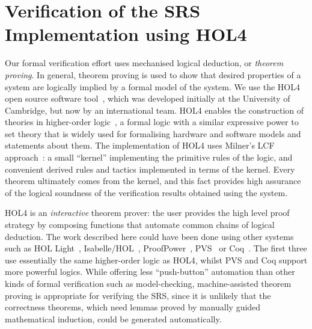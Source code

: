 \documentclass{llncs}
\begin{document}
\section{Verification of the SRS Implementation using HOL4}
\label{sec-verification}


Our formal verification effort uses mechanised logical deduction, or \emph{theorem proving}.
In general, theorem proving is used to show that desired properties of a system are logically implied by a formal model of the system.
We use the HOL4 open source software tool~\cite{HOL4,DBLP:conf/tphol/SlindN08}, which was developed initially at the University of Cambridge, but now by an international team.
HOL4 enables the construction of theories in higher-order logic~\cite{DBLP:journals/jsyml/Church40}, a formal logic with a similar expressive power to set theory that is widely used for formalising hardware and software models and statements about them.
The implementation of HOL4 uses Milner's LCF approach~\cite{Milner:1972:LCF:891954}: a small ``kernel'' implementing the primitive rules of the logic, and convenient derived rules and tactics implemented in terms of the kernel.
Every theorem ultimately comes from the kernel, and this fact provides high assurance of the logical soundness of the verification results obtained using the system.

HOL4 is an \emph{interactive} theorem prover: the user provides the high level proof strategy by composing functions that automate common chains of logical deduction.
The work described here could have been done using other systems such as HOL Light~\cite{HOLLight,DBLP:conf/tphol/Harrison09a}, Isabelle/HOL~\cite{Isabelle}, ProofPower~\cite{ProofPower}, PVS~\cite{PVS,DBLP:conf/tphol/OwreS08} or Coq~\cite{Coq}.
The first three use essentially the same higher-order logic as HOL4, whilst PVS and Coq support more powerful logics.
While offering less ``push-button'' automation than other kinds of formal verification such as model-checking, machine-assisted theorem proving is appropriate for verifying the SRS, since it is unlikely that the correctness theorems, which need lemmas proved by manually guided mathematical induction, could be generated automatically.
\end{document}
